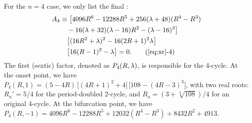 \documentclass{ws-ijbc}
\begin{document}
For the $n = 4$ case,
%
we only list the final : %
%
\begin{align}
A_4
& \equiv
    \big[
    4096 R^6-12288 R^5 +
    256 (\lambda + 48) (R^4- R^3) \notag \\
& \quad
    -16 (\lambda + 32)(\lambda - 16) R^2
      -(\lambda - 16)^3 \big] \notag \\
& \quad
    \big[(16 R^2 + \lambda)^2 - 16 (2R+1)^2 \lambda \big] \notag \\
& \quad
    \big[ 16 (R-1)^2 - \lambda \big]
 = 0.
\tag{\ref{eq:xr}-4}
\label{eq:xr4}
\end{align}
%
%
%
The first (sextic) factor, denoted as $P_4(R, \lambda)$,
  is responsible for the 4-cycle.
%
At the onset point, %
we have %
$ P_4(R, 1)
= (
    5 - 4R
  )
\, \big[
  (4R + 1)^2 + 4
  \big]
\, \big[
  108 - (4R - 3)^3
  \big]$,
%
%
%
with two real roots:
$R_a' = 5/4$
for the period-doubled 2-cycle,
and
$R_a = (3+\sqrt[3]{108})/4$
for an original 4-cycle. %
%
At the bifurcation point, %
we have $P_4(R, -1)
 = 4096 R^6 - 12288 R^5 + 12032 (R^4 - R^3)
  + 8432 R^2 + 4913$.
%
%
\end{document}
